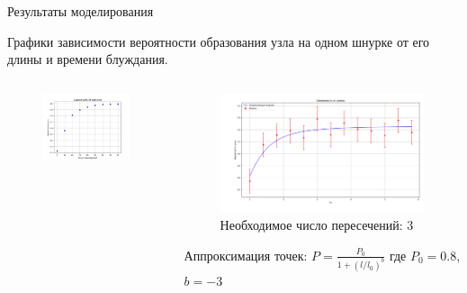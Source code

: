 \begin{frame}{Результаты моделирования}
		\begin{block}{}
			Графики зависимости вероятности образования узла на одном шнурке от его длины и времени блуждания.
		\end{block}



	\begin{columns}

		\begin{column}{0.5\linewidth}
			\begin{figure}[H]
				\includegraphics[width=1\linewidth]{img/time.png}
			\end{figure}

		\end{column}

		\begin{column}{0.5\linewidth}
			\begin{figure}[H]
				\includegraphics[width=1\linewidth]{img/model_3_er.png}
				Необходимое число пересечений: 3
			\end{figure}
			Аппроксимация точек:
			$P = \frac{P_0}{1+(l/l_0)^b}$
			где $P_0 = 0.8$, $b = -3$
		\end{column}


\end{columns}
\end{frame}
